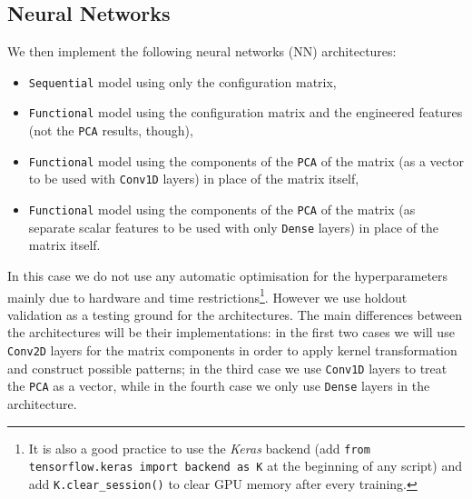 \subsection{Neural Networks}
    We then implement the following neural networks (NN) architectures:
    \begin{itemize}
        \item \texttt{Sequential} model using only the configuration matrix,
        \item \texttt{Functional} model using the configuration matrix and the engineered features (not the \texttt{PCA} results, though),
        \item \texttt{Functional} model using the components of the \texttt{PCA} of the matrix (as a vector to be used with \texttt{Conv1D} layers) in place of the matrix itself,
        \item \texttt{Functional} model using the components of the \texttt{PCA} of the matrix (as separate scalar features to be used with only \texttt{Dense} layers) in place of the matrix itself.
    \end{itemize}
    In this case we do not use any automatic optimisation for the hyperparameters mainly due to hardware and time restrictions\footnote{It is also a good practice to use the \textit{Keras} backend (add \texttt{from tensorflow.keras import backend as K} at the beginning of any script) and add \texttt{K.clear\_session()} to clear GPU memory after every training.}. However we use holdout validation as a testing ground for the architectures. The main differences between the architectures will be their implementations: in the first two cases we will use \texttt{Conv2D} layers for the matrix components in order to apply kernel transformation and construct possible patterns; in the third case we use \texttt{Conv1D} layers to treat the \texttt{PCA} as a vector, while in the fourth case we only use \texttt{Dense} layers in the architecture.
    
